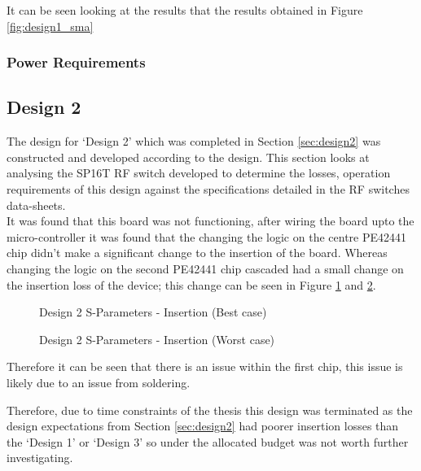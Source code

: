 \documentclass[12pt,openany,a4paper]{book}
\begin{document}
It can be seen looking at the results that the results obtained in Figure \ref{fig:design1_sma}




\subsubsection{Power Requirements}









\subsection{Design 2}
The design for `Design 2' which was completed in Section \ref{sec:design2} was constructed and developed according to the design. This section looks at analysing the SP16T RF switch developed to determine the losses, operation requirements of this design against the specifications detailed in the RF switches data-sheets. \\[0.2cm]
It was found that this board was not functioning, after wiring the board upto the micro-controller it was found that the changing the logic on the centre PE42441 chip didn't make a significant change to the insertion of the board. Whereas changing the logic on the second PE42441 chip cascaded had a small change on the insertion loss of the device; this change can be seen in Figure \ref{fig:design2_1} and \ref{fig:design2_2}.
\begin{figure}[H]
	\centering
	\caption{Design 2 S-Parameters - Insertion (Best case)}
	\label{fig:design2_1}
\end{figure} 
\begin{figure}[H]
	\centering
	\caption{Design 2 S-Parameters - Insertion (Worst case)}
	\label{fig:design2_2}
\end{figure} 
Therefore it can be seen that there is an issue within the first chip, this issue is likely due to an issue from soldering. 

Therefore, due to time constraints of the thesis this design was terminated as the design expectations from Section \ref{sec:design2} had poorer insertion losses than the `Design 1' or `Design 3' so under the allocated budget was not worth further investigating.   
\end{document}
